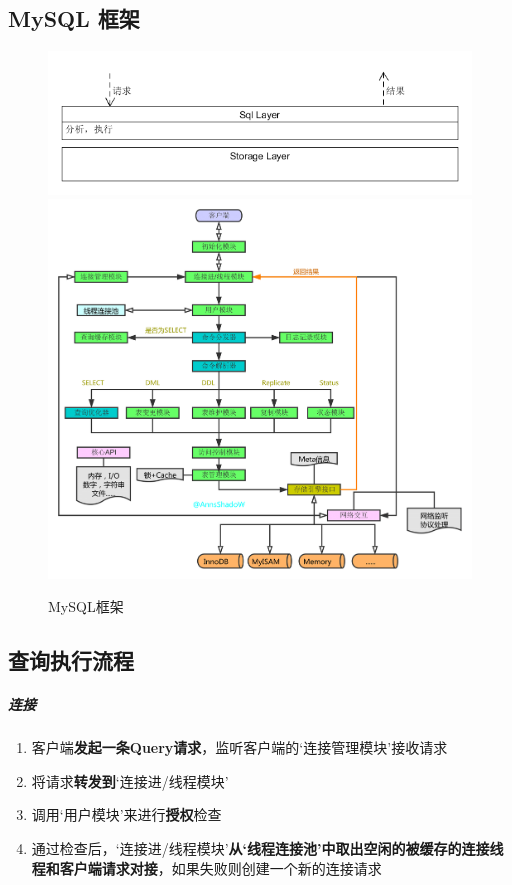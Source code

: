\documentclass[UTF8,a4paper,12pt]{ctexbook}
\begin{document}
		\subsection{MySQL 框架}
			\begin{figure}[H]
				\centering
				\includegraphics[scale=0.6]{sqlArch}
				\includegraphics[scale=0.3]{mysqlArch}
				\caption{MySQL框架}
			\end{figure}
			
		\subsection{查询执行流程}
			\subparagraph{连接}
				\begin{enumerate}[itemindent = 2em]
					\item 客户端\textbf{发起一条Query请求}，监听客户端的‘连接管理模块’接收请求
					\item 将请求\textbf{转发到}‘连接进/线程模块’
					\item 调用‘用户模块’来进行\textbf{授权}检查
					\item 通过检查后，‘连接进/线程模块’\textbf{从‘线程连接池’中取出空闲的被缓存的连接线程和客户端请求对接}，如果失败则创建一个新的连接请求
				\end{enumerate}
			
\end{document}
